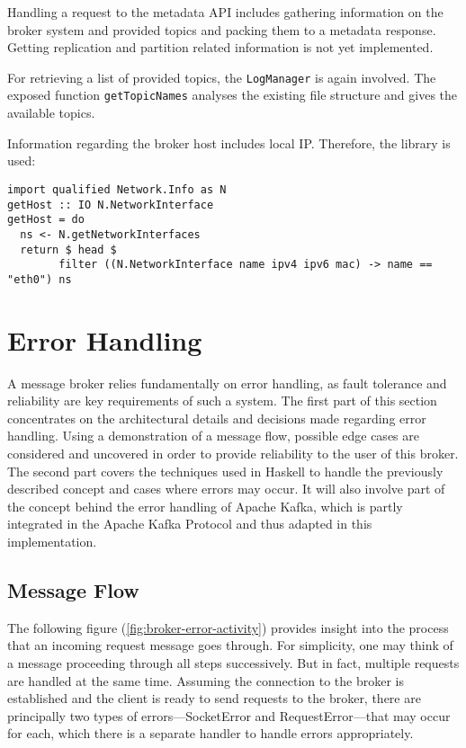Handling a request to the metadata API includes gathering information on the
broker system and provided topics and packing them to a metadata response.
Getting replication and partition related information is not yet implemented.

For retrieving a list of provided topics, the \lstinline{LogManager} is again
involved. The exposed function \lstinline{getTopicNames} analyses the existing
file structure and gives the available topics.

Information regarding the broker host includes local IP. Therefore, the library
 is used:

\begin{lstlisting}[caption={Example of getting the brokers host adress}]
import qualified Network.Info as N
getHost :: IO N.NetworkInterface
getHost = do
  ns <- N.getNetworkInterfaces
  return $ head $ 
        filter ((N.NetworkInterface name ipv4 ipv6 mac) -> name == "eth0") ns
\end{lstlisting}

\section{Error Handling}
\label{sec:broker-error-handling}

A message broker relies fundamentally on error handling, as fault tolerance and
reliability are key requirements of such a system. The first part of this
section concentrates on the architectural details and decisions made regarding
error handling. Using a demonstration of a message flow, possible edge cases are
considered and uncovered in order to provide reliability to the user of this
broker. The second part covers the techniques used in Haskell to handle the
previously described concept and cases where errors may occur. It will also
involve part of the concept behind the error handling of Apache Kafka, which is
partly integrated in the Apache Kafka Protocol and thus adapted in this
implementation.

\subsection{Message Flow}

The following figure (\ref{fig:broker-error-activity}) provides insight into
the process that an incoming request message goes through. For simplicity, one
may think of a message proceeding through all steps successively. But in fact,
multiple requests are handled at the same time. Assuming the connection to the
broker is established and the client is ready to send requests to the broker,
there are principally two types of errors---SocketError and RequestError---that
may occur for each, which there is a separate handler to handle errors
appropriately.

